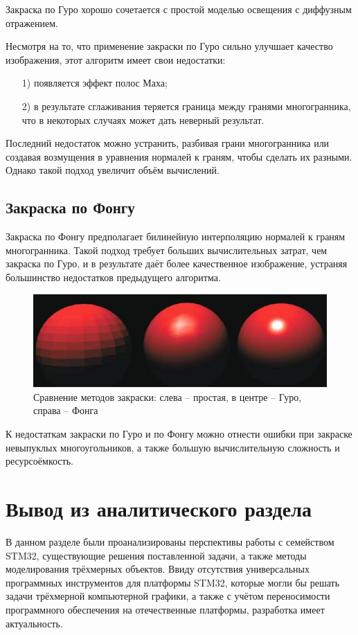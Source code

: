 Закраска по Гуро хорошо сочетается с простой моделью освещения с диффузным отражением.

Несмотря на то, что применение закраски по Гуро сильно улучшает качество изображения, этот алгоритм имеет свои недостатки:
\begin{enumerate}
	\item[1)] появляется эффект полос Маха;
	\item[2)] в результате сглаживания теряется граница между гранями многогранника, что в некоторых случаях может дать неверный результат.
\end{enumerate}

Последний недостаток можно устранить, разбивая грани многогранника или создавая возмущения в уравнения нормалей к граням, чтобы сделать их разными. Однако такой подход увеличит объём вычислений.

\subsection{Закраска по Фонгу}
Закраска по Фонгу предполагает билинейную интерполяцию нормалей к граням многогранника. Такой подход требует больших вычислительных затрат, чем закраска по Гуро, и в результате даёт более качественное изображение, устраняя большинство недостатков предыдущего алгоритма.

\begin{figure}[h]
	\centering
	\includegraphics[width=\textwidth ]{img/shading.png}
	\caption{Сравнение методов закраски: слева – простая, в центре – Гуро, справа – Фонга}
\end{figure}

К недостаткам закраски по Гуро и по Фонгу можно отнести ошибки при закраске невыпуклых многоугольников, а также большую вычислительную сложность и ресурсоёмкость.

\section{Вывод из аналитического раздела}
В данном разделе были проанализированы перспективы работы с семейством STM32, существующие решения поставленной задачи, а также методы моделирования трёхмерных объектов. Ввиду отсутствия универсальных программных инструментов для платформы STM32, которые могли бы решать задачи трёхмерной компьютерной графики, а также с учётом переносимости программного обеспечения на отечественные платформы, разработка имеет актуальность.

